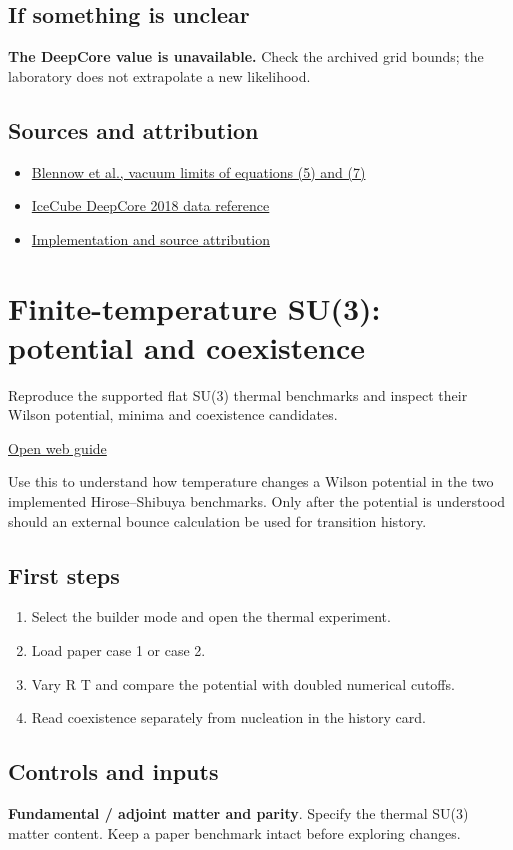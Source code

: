 \documentclass[11pt,a4paper]{article}
\begin{document}
\subsection*{If something is unclear}
\textbf{The DeepCore value is unavailable.} Check the archived grid bounds; the laboratory does not extrapolate a new likelihood.

\subsection*{Sources and attribution}
\begin{itemize}
\item \href{https://arxiv.org/abs/1609.08637}{Blennow et al., vacuum limits of equations (5) and (7)}
\item \href{https://doi.org/10.21234/B4105H}{IceCube DeepCore 2018 data reference}
\item \href{https://github.com/karlesmarin/ghu-lab/blob/main/src/modules/neutrino_research.mjs}{Implementation and source attribution}
\end{itemize}
\section{Finite-temperature SU(3): potential and coexistence}
Reproduce the supported flat SU(3) thermal benchmarks and inspect their Wilson potential, minima and coexistence candidates.

\href{https://karlesmarin.github.io/ghu-explorer/guide/thermal/index.html}{Open web guide}

Use this to understand how temperature changes a Wilson potential in the two implemented Hirose--Shibuya benchmarks. Only after the potential is understood should an external bounce calculation be used for transition history.
\subsection*{First steps}
\begin{enumerate}
\item Select the builder mode and open the thermal experiment.
\item Load paper case 1 or case 2.
\item Vary R T and compare the potential with doubled numerical cutoffs.
\item Read coexistence separately from nucleation in the history card.
\end{enumerate}
\subsection*{Controls and inputs}
\textbf{Fundamental / adjoint matter and parity}. Specify the thermal SU(3) matter content. Keep a paper benchmark intact before exploring changes.
\end{document}
